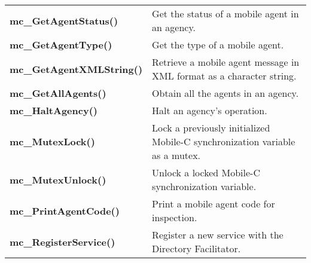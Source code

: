 \begin{table}[!h]
\begin{center}
\begin{tabular}{p{63 mm}p{97 mm}}
{\bf mc\_GetAgentStatus()} & Get the status of a mobile agent in an agency. \\
{\bf mc\_GetAgentType()} & Get the type of a mobile agent. \\
{\bf mc\_GetAgentXMLString()} & Retrieve a mobile agent message in XML format as a character string. \\
{\bf mc\_GetAllAgents()} & Obtain all the agents in an agency. \\
{\bf mc\_HaltAgency()} & Halt an agency's operation. \\
{\bf mc\_MutexLock()} & Lock a previously initialized Mobile-C synchronization variable as a mutex. \\
{\bf mc\_MutexUnlock()} & Unlock a locked Mobile-C synchronization variable. \\
{\bf mc\_PrintAgentCode()} & Print a mobile agent code for inspection. \\
{\bf mc\_RegisterService()} &  Register a new service with the Directory Facilitator. \\
\hline
\end{tabular}
\end{center}
\label{chmobilec_api_cscript}
\end{table}
\pagebreak

